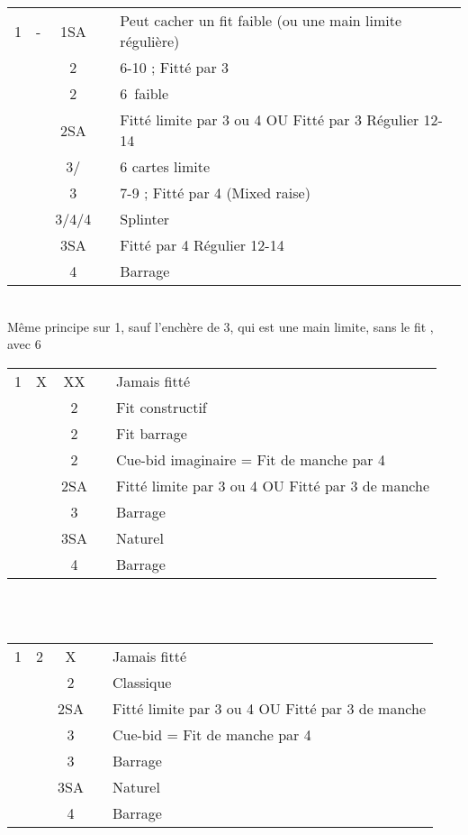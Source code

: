 \documentclass[a4paper, oneside, 11pt]{report}
\begin{document}
		\begin{tabular}{cccc|l}
		1\coeur & - & 1SA && Peut cacher un fit faible (ou une main limite régulière)\\
		&& 2\coeur && 6-10 ; Fitté par 3\\
		&& 2\pique && 6\pique\ faible\\
		&& 2SA && Fitté limite par 3 ou 4 OU Fitté par 3 Régulier 12-14  \\
		&& 3\trefle/\carreau && 6 cartes limite\\
		&& 3\coeur && 7-9 ; Fitté par 4 (Mixed raise)\\
		&& 3\pique/4\trefle/4\carreau && Splinter\\
		&& 3SA && Fitté par 4 Régulier 12-14\\
		&& 4\coeur && Barrage\\
		\end{tabular}\\

		Même principe sur 1\pique, sauf l'enchère de 3\coeur, qui est une main limite, sans le fit \pique,  avec 6\coeur\\

		\begin{tabular}{cccc|l}
		1\coeur & X & XX && Jamais fitté\\
		&& 2\carreau && Fit constructif\\
		&& 2\coeur && Fit barrage\\
		&& 2\pique && Cue-bid imaginaire = Fit de manche par 4\\
		&& 2SA && Fitté limite par 3 ou 4 OU Fitté par 3 de manche\\
		&& 3\coeur && Barrage\\
		&& 3SA && Naturel\\
		&& 4\coeur && Barrage\\
		\end{tabular}\\\\

		\begin{tabular}{cccc|l}
		1\coeur & 2\trefle & X && Jamais fitté\\
		&& 2\coeur && Classique\\
		&& 2SA && Fitté limite par 3 ou 4 OU Fitté par 3 de manche\\
		&& 3\trefle && Cue-bid = Fit de manche par 4\\
		&& 3\coeur && Barrage\\
		&& 3SA && Naturel\\
		&& 4\coeur && Barrage\\
		\end{tabular}\\\\
\end{document}
